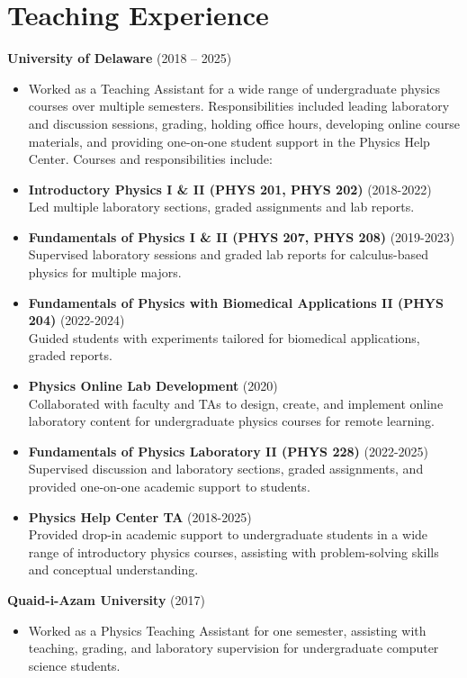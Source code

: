 \documentclass[letter,11pt]{article}
\begin{document}
\section{Teaching Experience}
\quad \textbf{University of Delaware} (2018 -- 2025)
\begin{itemize}
    \item[] Worked as a Teaching Assistant for a wide range of undergraduate physics courses over multiple semesters. Responsibilities included leading laboratory and discussion sessions, grading, holding office hours, developing online course materials, and providing one-on-one student support in the Physics Help Center. Courses and responsibilities include:
    \item \textbf{Introductory Physics I \& II (PHYS 201, PHYS 202)} (2018-2022) \\
        Led multiple laboratory sections, graded assignments and lab reports.
    \item \textbf{Fundamentals of Physics I \& II (PHYS 207, PHYS 208)} (2019-2023) \\
        Supervised laboratory sessions and graded lab reports for calculus-based physics for multiple majors.
    \item \textbf{Fundamentals of Physics with Biomedical Applications II (PHYS 204)} (2022-2024) \\
        Guided students with experiments tailored for biomedical applications, graded reports.
    \item \textbf{Physics Online Lab Development} (2020) \\
        Collaborated with faculty and TAs to design, create, and implement online laboratory content for undergraduate physics courses for remote learning.
    \item \textbf{Fundamentals of Physics Laboratory II (PHYS 228)} (2022-2025) \\
        Supervised discussion and laboratory sections, graded assignments, and provided one-on-one academic support to students.
    \item \textbf{Physics Help Center TA} (2018-2025) \\
        Provided drop-in academic support to undergraduate students in a wide range of introductory physics courses, assisting with problem-solving skills and conceptual understanding.
\end{itemize}
\vspace{2mm}
\quad \textbf{Quaid-i-Azam University} (2017)
\begin{itemize}
    \item[] Worked as a Physics Teaching Assistant for one semester, assisting with teaching, grading, and laboratory supervision for undergraduate computer science students.
\end{itemize}
\end{document}
